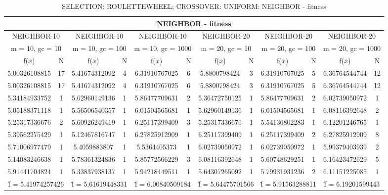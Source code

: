 \begin{table}[H]
	\centering
	\caption{SELECTION: ROULETTEWHEEL; CROSSOVER: UNIFORM: NEIGHBOR - fitness}
	\begin{adjustbox}{width=1\textwidth}
		\begin{tabular}{ |c|c||c|c||c|c||c|c||c|c||c|c| }
			\hline
			\multicolumn{12}{|c|}{NEIGHBOR - fitness} \\
			\hline
			\multicolumn{2}{|c||}{NEIGHBOR-10} & \multicolumn{2}{c||}{NEIGHBOR-10} & \multicolumn{2}{c||}{NEIGHBOR-10} & \multicolumn{2}{c||}{NEIGHBOR-20} & \multicolumn{2}{c||}{NEIGHBOR-20} & \multicolumn{2}{c|}{NEIGHBOR-20}\\
			\hline
			\multicolumn{2}{|c||}{m = 10, gc = 10} & \multicolumn{2}{c||}{m = 10, gc = 100} & \multicolumn{2}{c||}{m = 10, gc = 1000} & \multicolumn{2}{c||}{m = 20, gc = 10} & \multicolumn{2}{c||}{m = 20, gc = 100} & \multicolumn{2}{c|}{m = 20, gc = 1000}\\
			\hline
			f($\bar{x}$) & N & f($\bar{x}$) & N & f($\bar{x}$) & N & f($\bar{x}$) & N & f($\bar{x}$) & N & f($\bar{x}$) & N\\
			\hline
			\hline
			5.00326108815 & 17 & 5.41674312092 & 4 & 6.31910767025 & 6 & 5.8800798424 & 3 & 6.31910767025 & 5 & 6.36764544744 & 12\\
			\hline
			5.00326108815 & 17 & 5.41674312092 & 4 & 6.31910767025 & 6 & 5.8800798424 & 3 & 6.31910767025 & 5 & 6.36764544744 & 12\\
			5.34184933752 & 1 & 5.62960149136 & 1 & 5.86477709631 & 2 & 5.36472750125 & 1 & 5.86477709631 & 2 & 6.02739050972 & 1\\
			5.05188371118 & 1 & 5.56506540357 & 1 & 6.01504565681 & 1 & 5.62960149136 & 1 & 6.01504565681 & 1 & 6.08116392648 & 2\\
			5.25317336676 & 2 & 5.60926249419 & 1 & 6.25117399409 & 3 & 5.25317336676 & 1 & 5.54136802283 & 1 & 6.12201246765 & 1\\
			5.39562275429 & 1 & 5.12467816747 & 1 & 6.27825912909 & 1 & 6.25117399409 & 1 & 6.25117399409 & 2 & 6.27825912909 & 8\\
			5.71006977479 & 1 & 5.4059883807 & 1 & 5.5364405373 & 1 & 6.02739050972 & 1 & 6.02739050972 & 1 & 5.99379403939 & 2\\
			5.14083246638 & 1 & 5.78361324836 & 1 & 5.85772566229 & 3 & 6.08116392648 & 1 & 5.60748629251 & 1 & 6.16423472629 & 5\\
			5.91441704824 & 1 & 5.33837938137 & 1 & 5.94218449511 & 1 & 5.64307265092 & 1 & 5.79931931236 & 2 & 6.11151225085 & 1\\
			\hline
			\multicolumn{2}{|c||}{\^{f} = 5.41974257426} & \multicolumn{2}{c||}{\^{f} = 5.61619448331} & \multicolumn{2}{c||}{\^{f} = 6.00840509184} & \multicolumn{2}{c||}{\^{f} = 5.64475701566} & \multicolumn{2}{c||}{\^{f} = 5.91563288811} & \multicolumn{2}{c|}{\^{f} = 6.19201599443}\\
			\hline
		\end{tabular}
	\end{adjustbox}
\end{table}

